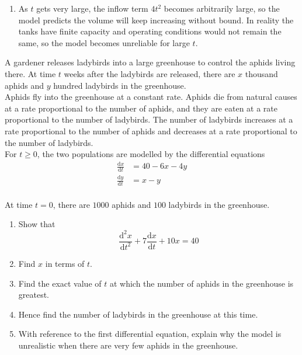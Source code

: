 \documentclass[leqno]{article}
\begin{document}
\begin{enumerate}[
  label=\textbf{\arabic*.},
  leftmargin=*,
  topsep=0pt,
  partopsep=0pt,
  parsep=0pt
]
\begin{djsSolution}
\begin{enumerate}[label=\textbf{(\alph*)}]
  Hence
  \[
  A(0.5)\approx 56.3
  \]

  So the estimated volume of water in tank A \(30\) minutes later is \(56.3\,\mathrm{m}^3\).

  \item As \(t\) gets very large, the inflow term \(4t^2\) becomes arbitrarily large, so the model predicts the volume will keep increasing without bound. In reality the tanks have finite capacity and operating conditions would not remain the same, so the model becomes unreliable for large \(t\).
\end{enumerate}
\end{djsSolution}


\newpage

\questionitem

A gardener releases ladybirds into a large greenhouse to control the aphids living there. At time $t$ weeks after the ladybirds are released, there are $x$ thousand aphids and $y$ hundred ladybirds in the greenhouse. \\

Aphids fly into the greenhouse at a constant rate. Aphids die from natural causes at a rate proportional to the number of aphids, and they are eaten at a rate proportional to the number of ladybirds. The number of ladybirds increases at a rate proportional to the number of aphids and decreases at a rate proportional to the number of ladybirds. \\

For $t \ge 0$, the two populations are modelled by the differential equations
\[
\begin{aligned}
\frac{\mathrm{d}x}{\mathrm{d}t} &= 40 - 6x - 4y \\
\frac{\mathrm{d}y}{\mathrm{d}t} &= x - y
\end{aligned}
\] \\
At time $t = 0$, there are $1000$ aphids and $100$ ladybirds in the greenhouse. \\
\begin{enumerate}[label=\textbf{(\alph*)}]
  \item Show that
  \[\frac{\mathrm{d}^2x}{\mathrm{d}t^2} + 7\frac{\mathrm{d}x}{\mathrm{d}t} + 10x = 40\] 
  \item Find $x$ in terms of $t$.  \\
  \item Find the exact value of $t$ at which the number of aphids in the greenhouse is greatest.  \\
  \item Hence find the number of ladybirds in the greenhouse at this time.  \\
  \item With reference to the first differential equation, explain why the model is unrealistic when there are very few aphids in the greenhouse.  \\
\end{enumerate}


\end{enumerate}
\end{document}
